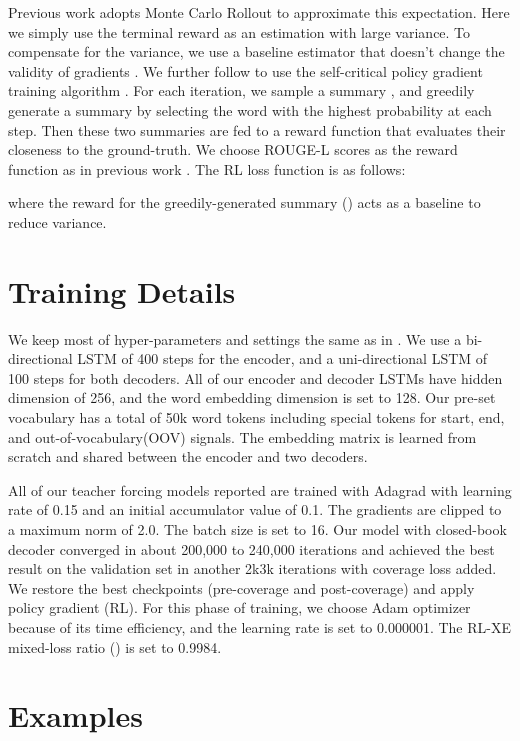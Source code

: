 \documentclass[11pt,a4paper]{article}
\begin{document}
Previous work \cite{Liu:16} adopts Monte Carlo Rollout to approximate this expectation. Here we simply use the terminal reward  as an estimation with large variance.
To compensate for the variance, we use a baseline estimator that doesn't change the validity of gradients \cite{Williams:92}. We further follow  to use the self-critical policy gradient training algorithm \cite{Rennie:16,Williams:92}. For each iteration, we sample a summary , and greedily generate a summary  by selecting the word with the highest probability at each step.
Then these two summaries are fed to a reward function  that evaluates their closeness to the ground-truth. We choose ROUGE-L scores as the reward function  as in previous work \cite{Paulus:17}. The RL loss function is as follows:

where the reward for the greedily-generated summary () acts as a baseline to reduce variance.


\section{Training Details}
We keep most of hyper-parameters and settings the same as in .
We use a bi-directional LSTM of 400 steps for the encoder, and a uni-directional LSTM of 100 steps for both decoders.
All of our encoder and decoder LSTMs have hidden dimension of 256, and the word embedding dimension is set to 128. Our pre-set vocabulary has a total of 50k word tokens including special tokens for start, end, and out-of-vocabulary(OOV) signals. The embedding matrix is learned from scratch and shared between the encoder and two decoders.

All of our teacher forcing models reported are trained with Adagrad \cite{Adagrad:11} with learning rate of 0.15 and an initial accumulator value of 0.1. The gradients are clipped to a maximum norm of 2.0. 
The batch size is set to 16. Our model with closed-book decoder converged in about 200,000 to 240,000 iterations and achieved the best result on the validation set in another 2k\texttildelow 3k iterations with coverage loss added.
We restore the best checkpoints (pre-coverage and post-coverage) and apply policy gradient (RL). 
For this phase of training, we choose Adam optimizer \cite{Adam:14} because of its time efficiency, and the learning rate is set to 0.000001. The RL-XE mixed-loss ratio () is set to 0.9984.

\section{Examples}
\end{document}
